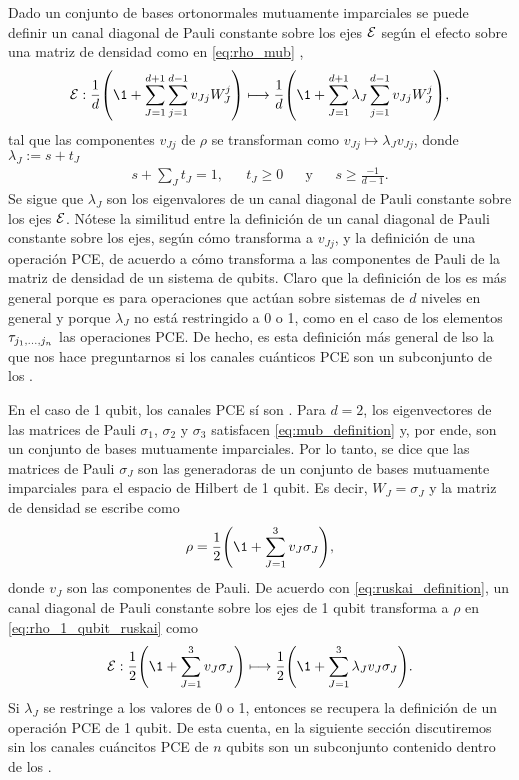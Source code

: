Dado un conjunto de bases ortonormales mutuamente imparciales se
puede definir un canal diagonal de Pauli constante sobre los ejes $\mathcal{E}$ 
según el efecto sobre una matriz de densidad como en \eqref{eq:rho_mub}
\cite{nathanson2007pauli},
\begin{align}\label{eq:ruskai_definition}
	\E :  \frac{1}{d}\qty(\1+\sum_{J=1}^{d+1}\sum_{j=1}^{d-1} v_{Jj}W_J^j)
	\longmapsto 
	\frac{1}{d}\qty(\1+\sum_{J=1}^{d+1}\lambda_J\sum_{j=1}^{d-1} v_{Jj}W_J^j),
\end{align}
tal que las componentes $v_{Jj}$ de $\rho$ se transforman como 
$v_{Jj}\mapsto\lambda_Jv_{Jj}$, donde $\lambda_J:=s+t_J$
\begin{align}\label{eq:cptp_conditions_ruskai}
	s+\sum_{J}t_J=1, && t_J\geq0 && \text{y} && s\geq\frac{-1}{d-1}.
\end{align}
Se sigue que $\lambda_J$ son los 
eigenvalores de un canal diagonal de Pauli constante sobre los ejes $\mathcal{E}$.
Nótese la similitud entre la definición de un canal diagonal de Pauli constante
sobre los ejes, según cómo transforma a $v_{Jj}$, y 
la definición de una operación PCE, de acuerdo a cómo transforma a las 
componentes de Pauli de la matriz de densidad de un sistema de qubits.
Claro que la definición de los \ruskai es más general porque es para
operaciones que actúan sobre sistemas de $d$ niveles en general y porque 
$\lambda_J$ no está restringido a 0 o 1, como en el caso de los 
elementos $\tau_{j_1,\ldots ,j_n}$ las operaciones PCE. De hecho, es esta definición 
más general de lso \ruskai la que nos hace preguntarnos si los canales cuánticos 
PCE son un subconjunto de los \ruskai.

En el caso de 1 qubit, los canales PCE sí son \ruskai{}. Para $d=2$,
los eigenvectores de las matrices de Pauli $\sigma_1$, $\sigma_2$ y $\sigma_3$ 
satisfacen \eqref{eq:mub_definition} y, por ende, son un conjunto 
de bases mutuamente imparciales. Por lo tanto, se dice que las 
matrices de Pauli $\sigma_J$ son las generadoras de un conjunto de
bases mutuamente imparciales para el espacio de Hilbert de 1 qubit.
Es decir, $W_J=\sigma_J$ y la matriz de densidad se escribe como
\begin{align} \label{eq:rho_1_qubit_ruskai}
	\rho=\frac{1}{2}\qty(\1+\sum_{J=1}^3v_J\sigma_J),
\end{align}
donde $v_J$ son las componentes de Pauli.
De acuerdo con \eqref{eq:ruskai_definition}, 
un canal diagonal de Pauli constante sobre los ejes de 1 qubit transforma 
a $\rho$ en \eqref{eq:rho_1_qubit_ruskai} como
\begin{align}
	\E :  \frac{1}{2}\qty(\1+\sum_{J=1}^3v_J\sigma_J)
	\longmapsto 
	\frac{1}{2}\qty(\1+\sum_{J=1}^3\lambda_J v_J\sigma_J).
\end{align}
Si $\lambda_J$ se restringe a los valores de 0 o 1, entonces se recupera 
la definición de un operación PCE de 1 qubit. De esta cuenta, 
en la siguiente sección discutiremos sin los canales cuáncitos
PCE de $n$ qubits son un subconjunto contenido dentro de los \ruskai{}.

